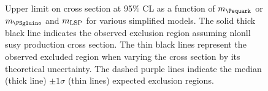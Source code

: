 \begin{figure}[h!]
  \begin{center}
     \\
     \\
     \\
    \caption{\label{fig:limits-sms}Upper limit on cross section at
      95\% CL as a function of $m_{\Psquark}$ or $m_{\PSgluino}$ and $m_{\rm
        LSP}$ for various simplified models. The solid thick black
      line indicates the observed exclusion region assuming \ac{nlonll}
      \ac{susy} production cross section. The thin black lines represent
      the observed excluded region when varying the cross section by
      its theoretical uncertainty. The dashed purple lines indicate
      the median (thick line) $\pm 1 \sigma$ (thin lines) expected
      exclusion regions.}
  \end{center}
\end{figure}

